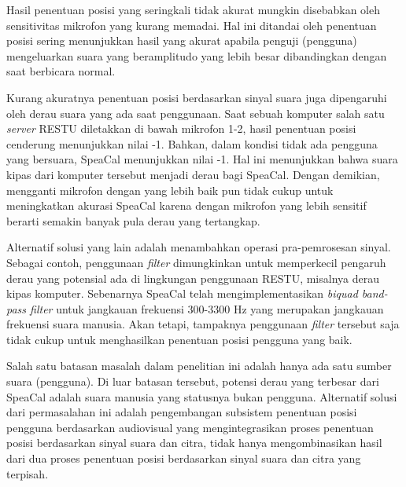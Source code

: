 Hasil penentuan posisi yang seringkali tidak akurat mungkin disebabkan oleh sensitivitas mikrofon yang kurang memadai. Hal ini ditandai oleh penentuan posisi sering menunjukkan hasil yang akurat apabila penguji (pengguna) mengeluarkan suara yang beramplitudo yang lebih besar dibandingkan dengan saat berbicara normal.

Kurang akuratnya penentuan posisi berdasarkan sinyal suara juga dipengaruhi oleh derau suara yang ada saat penggunaan. Saat sebuah komputer salah satu \textit{server} RESTU diletakkan di bawah mikrofon 1-2, hasil penentuan posisi cenderung menunjukkan nilai -1. Bahkan, dalam kondisi tidak ada pengguna yang bersuara, SpeaCal menunjukkan nilai -1. Hal ini menunjukkan bahwa suara kipas dari komputer tersebut menjadi derau bagi SpeaCal. Dengan demikian, mengganti mikrofon dengan yang lebih baik pun tidak cukup untuk meningkatkan akurasi SpeaCal karena dengan mikrofon yang lebih sensitif berarti semakin banyak pula derau yang tertangkap.

Alternatif solusi yang lain adalah menambahkan operasi pra-pemrosesan sinyal. Sebagai contoh, penggunaan \textit{filter} dimungkinkan untuk memperkecil pengaruh derau yang potensial ada di lingkungan penggunaan RESTU, misalnya derau kipas komputer. Sebenarnya SpeaCal telah mengimplementasikan \textit{biquad band-pass filter} untuk jangkauan frekuensi 300-3300 Hz yang merupakan jangkauan frekuensi suara manusia. Akan tetapi, tampaknya penggunaan \textit{filter} tersebut saja tidak cukup untuk menghasilkan penentuan posisi pengguna yang baik.

Salah satu batasan masalah dalam penelitian ini adalah hanya ada satu sumber suara (pengguna). Di luar batasan tersebut, potensi derau yang terbesar dari SpeaCal adalah suara manusia yang statusnya bukan pengguna. Alternatif solusi dari permasalahan ini adalah pengembangan subsistem penentuan posisi pengguna berdasarkan audiovisual yang mengintegrasikan proses penentuan posisi berdasarkan sinyal suara dan citra, tidak hanya mengombinasikan hasil dari dua proses penentuan posisi berdasarkan sinyal suara dan citra yang terpisah.
